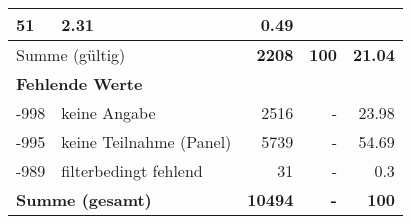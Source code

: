 \begin{longtable}{lXrrr}
       \num{51} &
       \num[round-mode=places,round-precision=2]{2,31} &
         \num[round-mode=places,round-precision=2]{0,49} \\
     \midrule
     \multicolumn{2}{l}{Summe (gültig)} &
       \textbf{\num{2208}} &
     \textbf{100} &
       \textbf{\num[round-mode=places,round-precision=2]{21,04}} \\
     \multicolumn{5}{l}{\textbf{Fehlende Werte}}\\
       -998 &
       keine Angabe &
         \num{2516} &
        - &
         \num[round-mode=places,round-precision=2]{23,98} \\
       -995 &
       keine Teilnahme (Panel) &
         \num{5739} &
        - &
         \num[round-mode=places,round-precision=2]{54,69} \\
       -989 &
       filterbedingt fehlend &
         \num{31} &
        - &
         \num[round-mode=places,round-precision=2]{0,3} \\
     \midrule
     \multicolumn{2}{l}{\textbf{Summe (gesamt)}} &
          \textbf{\num{10494}} &
        \textbf{-} &
        \textbf{100} \\
     \bottomrule
     \end{longtable}
     
